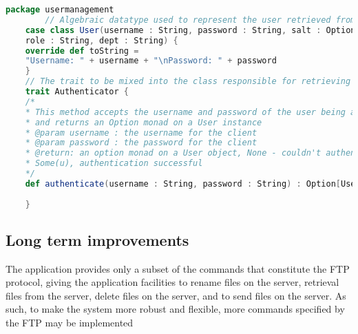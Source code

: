 \begin{lstlisting}[language=Scala, caption=Database of users, tabsize=2]
	package usermanagement
		// Algebraic datatype used to represent the user retrieved from the database
	case class User(username : String, password : String, salt : Option[String],
	role : String, dept : String) {
	override def toString =
	"Username: " + username + "\nPassword: " + password
	}
	// The trait to be mixed into the class responsible for retrieving user informaion
	trait Authenticator {
	/*
	* This method accepts the username and password of the user being added
	* and returns an Option monad on a User instance
	* @param username : the username for the client
	* @param password : the password for the client
	* @return: an option monad on a User object, None - couldn't authenticate,
	* Some(u), authentication successful
	*/
	def authenticate(username : String, password : String) : Option[User]
	
	}
\end{lstlisting}


\subsection{Long term improvements}
The application provides only a subset of the commands that constitute the FTP protocol, giving the application facilities to rename files on the server, retrieval files from the server, delete files on the server, and to send files on the server. As such, to make the system more robust and flexible, more commands specified by the FTP may be implemented 

